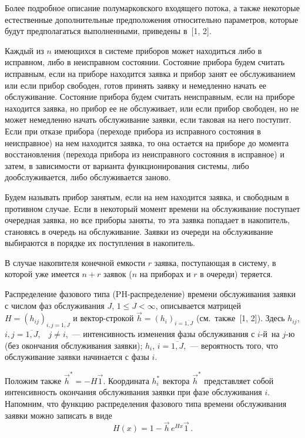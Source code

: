 \begin{multicols}{2}
Более подробное описание полумарковского входящего потока,
а также некоторые естественные дополнительные предположения
относительно параметров, которые будут предполагаться
выполненными, приведены в~[1, 2].

Каждый из $n$ имеющихся в системе приборов может находиться
либо в исправном, либо в неисправном состоянии.
Состояние прибора будем считать исправным, если на приборе находится
заявка и прибор занят ее обслуживанием или если прибор свободен,
готов принять заявку и немедленно начать ее обслуживание.
Состояние прибора будем считать неисправным, если на приборе находится
заявка, но прибор ее не обслуживает, или если прибор свободен,
но не может немедленно начать обслуживание заявки, если таковая на него
поступит.
Если при отказе прибора (переходе прибора из исправного состояния в
неисправное) на нем находится заявка, то она остается на приборе до
момента восстановления (перехода прибора из неисправного состояния в
исправное) и затем, в зависимости от варианта функционирования
сис\-те\-мы, либо дообслуживается, либо обслуживается заново.

Будем называть прибор занятым, если на нем находится заявка, и
свободным в противном случае.
Если в некоторый момент времени на обслуживание поступает очередная
заявка, но все приборы заняты, то эта заявка попадает в накопитель,
становясь в очередь на обслуживание.
Заявки из очереди на обслуживание выбираются в порядке их поступления
в накопитель.

В случае накопителя конечной емкости $r$ заявка, поступающая в систему,
в которой уже имеется $n+r$ заявок ($n$ на приборах и $r$ в очереди)
теряется.

Распределение фазового типа (PH-рас\-пре\-де\-ле\-ние) времени обслуживания
заявки с числом фаз обслуживания $J$, $1\le J <\infty$, описывается матрицей 
$H=(h_{ij})_{i,j=\overline{1,J}}$ и вектор-строкой $\vec 
h=(h_i)_{i=\overline{1,J}}$ (см.\ также~[1, 2]). Здесь $h_{ij}$, 
$i,j=\overline{1,J}$,\ \ $j\ne i$,~--- интенсивность изменения фазы 
обслуживания с \mbox{$i$-й}~на $j$-ю (без окончания обслуживания заявки); 
$h_i$, $i=\overline{1,J}$,~--- вероятность того, что обслуживание заявки 
начинается с фазы $i$.

Положим также $\vec h^*= -H\vec1$.
Координата $h_i^*$ вектора $\vec h^*$ представляет собой
интенсивность окончания обслуживания заявки при фазе обслуживания $i$.
Напомним, что функцию распределения фазового типа времени обслуживания
заявки можно записать в виде
$$
H(x) = 1-\vec h\, e^{Hx} \vec1\,.
$$


\end{multicols}
